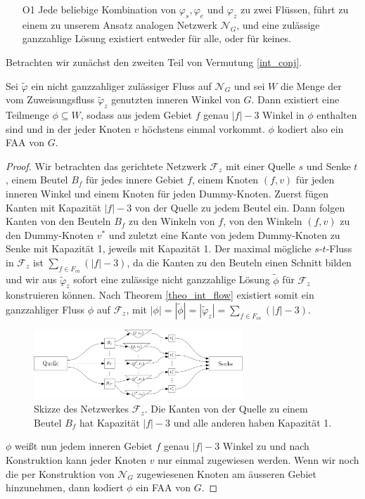 \begin{itemize}
\item [O1] Jede beliebige Kombination von $\varphi_s,\varphi_e$ und $\varphi_z$ zu zwei Flüssen, führt zu einem zu unserem Ansatz analogen Netzwerk $\mathcal{N}_G$, und eine zulässige ganzzahlige Lösung existiert entweder für alle, oder für keines.
\end{itemize}

Betrachten wir zunächst den zweiten Teil von Vermutung \ref{int_conj}.

\begin{lemma}\label{lem_faa}
Sei $\tilde{\varphi}$ ein nicht ganzzahliger zulässiger Fluss auf $\mathcal{N}_G$ und sei $W$ die Menge der vom Zuweisungsfluss $\tilde{\varphi}_z$ genutzten inneren Winkel von $G$. Dann existiert eine Teilmenge $\phi\subseteq W$, sodass aus jedem Gebiet $f$ genau $|f|-3$ Winkel in $\phi$ enthalten sind und in der jeder Knoten $v$ höchstens einmal vorkommt. $\phi$ kodiert also ein FAA von $G$.
\end{lemma}

\begin{proof}
Wir betrachten das gerichtete Netzwerk $\mathcal{F}_z$ mit einer Quelle $s$ und Senke $t$, einem Beutel $B_f$ für jedes innere Gebiet $f$, einem Knoten $(f,v)$ für jeden inneren Winkel und einem Knoten für jeden Dummy-Knoten. Zuerst fügen Kanten mit Kapazität $|f|-3$ von der Quelle zu jedem Beutel ein. Dann folgen Kanten von den Beuteln $B_f$ zu den Winkeln von $f$, von den Winkeln $(f,v)$ zu den Dummy-Knoten $v^*$ und zuletzt eine Kante von jedem Dummy-Knoten zu Senke mit Kapazität 1, jeweils mit Kapazität 1. Der maximal mögliche $s$-$t$-Fluss in $\mathcal{F}_z$ ist $\sum_{f \in F_{in}}(|f|-3)$, da die Kanten zu den Beuteln einen Schnitt bilden und wir  aus $\tilde{\varphi}_z$ sofort eine zulässige nicht ganzzahlige Lösung $\tilde{\phi}$ für $\mathcal{F}_z$ konstruieren können. Nach Theorem \ref{theo_int_flow} existiert somit ein ganzzahliger Fluss $\phi$ auf $\mathcal{F}_z$, mit $|\phi| = |\tilde{\phi}| = |\tilde{\varphi}_z| = \sum_{f \in F_{in}}(|f|-3).$

\begin{figure}[h]
	\centering
  	\includegraphics[width=0.7\textwidth]{lem_faa_choice.png}
  	\caption{Skizze des Netzwerkes $\mathcal{F}_z$. Die Kanten von der Quelle zu einem Beutel $B_f$ hat Kapazität $|f|-3$ und alle anderen haben Kapazität 1.}
\end{figure}

$\phi$ weißt nun jedem inneren Gebiet $f$ genau $|f|-3$ Winkel zu und nach Konstruktion kann jeder Knoten $v$ nur einmal zugewiesen werden. Wenn wir noch die per Konstruktion von $\mathcal{N}_G$ zugewiesenen Knoten am äusseren Gebiet hinzunehmen, dann kodiert $\phi$ ein FAA von $G$.
\end{proof}

